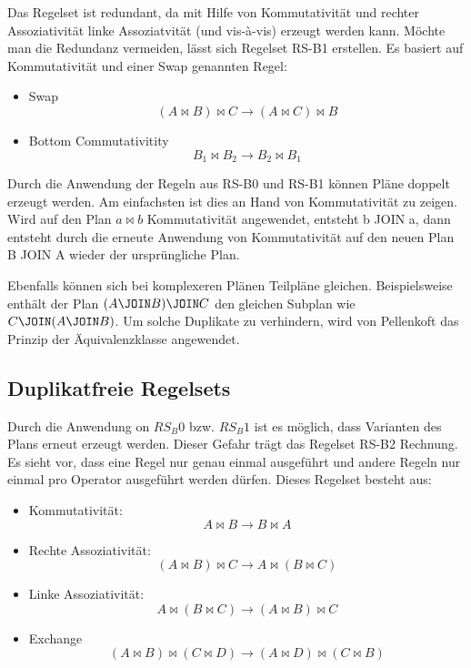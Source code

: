 Das Regelset ist redundant, da mit Hilfe von Kommutativität und rechter Assoziativität linke Assoziatvität (und vis-à-vis) erzeugt werden kann. Möchte man die Redundanz vermeiden, lässt sich Regelset RS-B1 erstellen. Es basiert auf Kommutativität und einer Swap genannten Regel:

\begin{itemize}
\item Swap $$ (A \Join B) \Join C \to (A \Join C) \Join B $$
\item Bottom Commutativitity $$ B_1 \Join B_2 \to B_2 \Join B_1$$
\end{itemize}

Durch die Anwendung der Regeln aus RS-B0 und RS-B1 können Pläne doppelt erzeugt werden. Am einfachsten ist dies an Hand von Kommutativität zu zeigen. Wird auf den Plan $a \Join b$ Kommutativität angewendet, entsteht b JOIN a, dann entsteht durch  die erneute Anwendung von Kommutativität auf den neuen Plan B JOIN A wieder der ursprüngliche Plan.

Ebenfalls können sich bei komplexeren Plänen     Teilpläne gleichen. Beispielsweise enthält der Plan $(A \JOIN B) \JOIN C$ den gleichen Subplan wie $C \JOIN (A \JOIN B)$. Um solche Duplikate zu verhindern, wird von Pellenkoft das Prinzip der Äquivalenzklasse angewendet.



\subsection{Duplikatfreie Regelsets}
Durch die Anwendung on $RS_B0$ bzw. $RS_B1$ ist es möglich, dass Varianten des Plans erneut erzeugt werden. Dieser Gefahr trägt das Regelset RS-B2 Rechnung. Es sieht vor, dass eine Regel nur genau einmal ausgeführt und andere Regeln nur einmal pro Operator ausgeführt werden dürfen. Dieses Regelset besteht aus:


\begin{itemize}
\item Kommutativität: $$ A \Join B \to B \Join A$$
\item Rechte Assoziativität: $$(A \Join B) \Join C \to A \Join (B \Join C) $$
\item Linke Assoziativität: $$A \Join (B \Join C) \to (A \Join B) \Join C$$

\item Exchange $$(A \Join B) \Join (C \Join D) \to (A \Join D) \Join (C \Join B) $$
\end{itemize}



